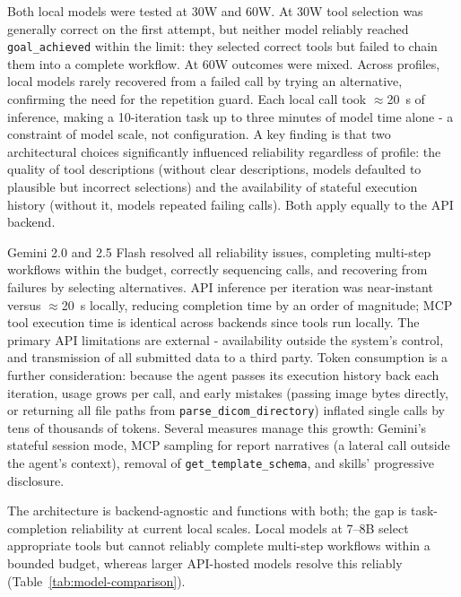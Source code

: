 \documentclass[1p,12pt]{elsarticle}
\begin{document}
Both local models were tested at 30W and 60W. At 30W tool selection was generally correct on the first attempt, but neither model reliably reached \texttt{goal\_achieved} within the limit: they selected correct tools but failed to chain them into a complete workflow. At 60W outcomes were mixed. Across profiles, local models rarely recovered from a failed call by trying an alternative, confirming the need for the repetition guard. Each local call took $\approx$20~s of inference, making a 10-iteration task up to three minutes of model time alone - a constraint of model scale, not configuration. A key finding is that two architectural choices significantly influenced reliability regardless of profile: the quality of tool descriptions (without clear descriptions, models defaulted to plausible but incorrect selections) and the availability of stateful execution history (without it, models repeated failing calls). Both apply equally to the API backend.

Gemini 2.0 and 2.5 Flash resolved all reliability issues, completing multi-step workflows within the budget, correctly sequencing calls, and recovering from failures by selecting alternatives. API inference per iteration was near-instant versus $\approx$20~s locally, reducing completion time by an order of magnitude; MCP tool execution time is identical across backends since tools run locally. The primary API limitations are external - availability outside the system's control, and transmission of all submitted data to a third party. Token consumption is a further consideration: because the agent passes its execution history back each iteration, usage grows per call, and early mistakes (passing image bytes directly, or returning all file paths from \texttt{parse\_dicom\_directory}) inflated single calls by tens of thousands of tokens. Several measures manage this growth: Gemini's stateful session mode, MCP sampling for report narratives (a lateral call outside the agent's context), removal of \texttt{get\_template\_schema}, and skills' progressive disclosure.

The architecture is backend-agnostic and functions with both; the gap is task-completion reliability at current local scales. Local models at 7--8B select appropriate tools but cannot reliably complete multi-step workflows within a bounded budget, whereas larger API-hosted models resolve this reliably (Table~\ref{tab:model-comparison}).
\end{document}
